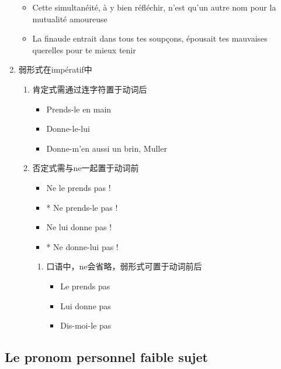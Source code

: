 \documentclass[UTF8]{report}
\begin{document}
\begin{enumerate}
    \begin{itemize}
        \item Cette simultanéité, à y bien réfléchir, n’est qu’un autre nom pour la mutualité amoureuse
        \item La finaude entrait dans tous tes soupçons, épousait tes mauvaises querelles pour te mieux tenir
    \end{itemize}
    \item 弱形式在impératif中
    \begin{enumerate}
        \item 肯定式需通过连字符置于动词后
        \begin{itemize}
            \item Prends-le en main
            \item Donne-le-lui
            \item Donne-m’en aussi un brin, Muller
        \end{itemize}
        \item 否定式需与ne一起置于动词前
        \begin{itemize}
            \item Ne le prends pas !
            \item * Ne prends-le pas !
            \item Ne lui donne pas !
            \item * Ne donne-lui pas !
        \end{itemize}
        \begin{enumerate}
            \item 口语中，ne会省略，弱形式可置于动词前后
            \begin{itemize}
                \item Le prends pas 
                \item Lui donne pas
                \item Dis-moi-le pas
            \end{itemize}
        \end{enumerate}
    \end{enumerate}
\end{enumerate}

\subsection{Le pronom personnel faible sujet}
\end{document}
